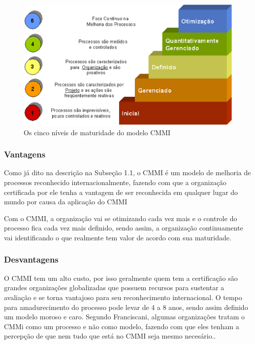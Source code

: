   \begin{figure}[!ht]
    \centering
    \includegraphics[width=15cm, keepaspectratio=true]{figuras/maturidade/niveis-cmmi.eps}
    \caption{Os cinco níveis de maturidade do modelo CMMI}
  \end{figure}

\subsubsection{Vantagens}

  Como já dito na descrição na Subseção 1.1, o CMMI é um modelo de melhoria
  de processos reconhecido internacionalmente, fazendo com que a organização
  certificada por ele tenha a vantagem de ser reconhecida em qualquer lugar
  do mundo por causa da aplicação do CMMI

  Com o CMMI, a organização vai se otimizando cada vez mais e o controle do
  processo fica cada vez mais definido, sendo assim, a organização continuamente
  vai identificando o que realmente tem valor de acordo com sua maturidade.

\subsubsection{Desvantagens}

  O CMMI tem um alto custo, por isso geralmente quem tem a certificação são
  grandes organizações globalizadas que possuem recursos para sustentar a
  avaliação e se torna vantajoso para seu reconhecimento internacional. O
  tempo para amadurecimento do processo pode levar de 4 a 8 anos, sendo assim
  definido um modelo moroso e caro. Segundo Franciscani, algumas organizações
  tratam o CMMi como um processo e não como modelo, fazendo com que eles tenham
  a percepção de que nem tudo que está no CMMI seja mesmo necesário.\cite{francis2012}.

